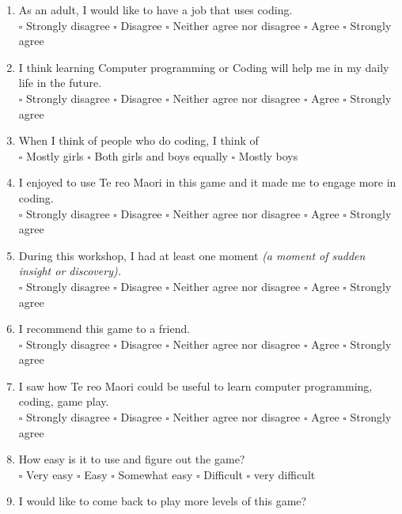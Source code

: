 \documentclass[12pt]{article}\pagestyle{myheadings}
\theoremstyle{plain}
\begin{document}
\begin{enumerate}
\item As an adult, I would like to have a job that uses coding. \\ 
$\square$ Strongly disagree $\square$ Disagree $\square$ Neither agree nor disagree $\square$ Agree $\square$ Strongly agree


\item I think learning Computer programming or Coding will help me in my daily life in the future.\\
$\square$ Strongly disagree $\square$ Disagree $\square$ Neither agree nor disagree $\square$ Agree $\square$ Strongly agree



\item When I think of people who do coding, I think of \\
$\square$ Mostly girls $\square$ Both girls and boys equally $\square$ Mostly boys


\item I enjoyed to use Te reo Maori in this game and it made me to engage more in coding. \\
$\square$ Strongly disagree $\square$ Disagree $\square$ Neither agree nor disagree $\square$ Agree $\square$ Strongly agree

\item During this workshop, I had at least one  moment \textit{(a moment of sudden insight or discovery).} \\
$\square$ Strongly disagree $\square$ Disagree $\square$ Neither agree nor disagree $\square$ Agree $\square$ Strongly agree

\item I recommend this game to a friend. \\
$\square$ Strongly disagree $\square$ Disagree $\square$ Neither agree nor disagree $\square$ Agree $\square$ Strongly agree


\item I saw how Te reo Maori could be useful to learn computer programming, coding, game play. \\
$\square$ Strongly disagree $\square$ Disagree $\square$ Neither agree nor disagree $\square$ Agree $\square$ Strongly agree


\item  How easy is it to use and figure out the game?\\
$\square$ Very easy $\square$ Easy $\square$ Somewhat easy $\square$ Difficult $\square$ very difficult


\item I would like to come back to play more levels of this game?\\ 


\end{enumerate}
\end{document}
